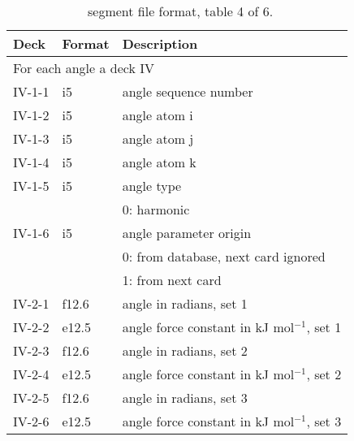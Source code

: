 \begin{table}
\begin{center}
\begin{tabular*}{150mm}{p{12mm}p{12mm}l}
\hline\hline
Deck & Format & Description \\ \hline
\multicolumn{3}{l}{For each angle a deck IV} \\
IV-1-1 & i5     & angle sequence number \\
IV-1-2 & i5     & angle atom i \\
IV-1-3 & i5     & angle atom j \\
IV-1-4 & i5     & angle atom k \\
IV-1-5 & i5     & angle type \\
       &        & 0: harmonic\\
IV-1-6 & i5     & angle parameter origin\\
       &        & 0: from database, next card ignored \\
       &        & 1: from next card\\
IV-2-1 & f12.6  & angle in radians, set 1\\
IV-2-2 & e12.5  & angle force constant in kJ mol$^{-1}$, set 1 \\
IV-2-3 & f12.6  & angle in radians, set 2\\
IV-2-4 & e12.5  & angle force constant in kJ mol$^{-1}$, set 2 \\
IV-2-5 & f12.6  & angle in radians, set 3\\
IV-2-6 & e12.5  & angle force constant in kJ mol$^{-1}$, set 3 \\
\hline
\end{tabular*}
\caption{\nwargos\ segment file format, table 4 of 6.\label{tbl:nwaseg4}}
\end{center}
\end{table}

